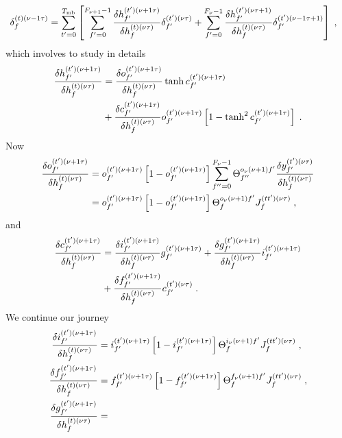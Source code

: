 \begin{subappendices}
\begin{align}
\delta^{(t)(\nu-1\tau)}_f&= \sum_{t'=0}^{T_{{\rm mb}}}\left[\sum_{f'=0}^{F_{\nu+1}-1}
%
\frac{\delta h^{(t')(\nu+1\tau)}_{f'}}{\delta h^{(t)(\nu\tau)}_f }\delta^{(t')(\nu\tau)}_{f'}
%
+\sum_{f'=0}^{F_{\nu}-1}\frac{\delta h^{(t')(\nu\tau+1)}_{f'}}{\delta h^{(t)(\nu\tau)}_f }\delta^{(t')(\nu-1\tau+1)}_{f'}\right]\;,
\end{align}
which involves to study in details
\begin{align}
\frac{\delta h^{(t')(\nu+1\tau)}_{f'}}{\delta h^{(t)(\nu\tau)}_f }&=
%
\frac{\delta o^{(t')(\nu+1\tau)}_{f'}}{\delta h^{(t)(\nu\tau)}_f }\tanh c^{(t')(\nu+1\tau)}_{f'}\notag\\
%
&+\frac{\delta c^{(t')(\nu+1\tau)}_{f'}}{\delta h^{(t)(\nu\tau)}_f } o^{(t')(\nu+1\tau)}_{f'}
%
\left[1-\tanh^2 c^{(t')(\nu+1\tau)}_{f'}\right]\;.
\end{align}
Now
\begin{align}
\frac{\delta o^{(t')(\nu+1\tau)}_{f'}}{\delta h^{(t)(\nu\tau)}_f }&=o^{(t')(\nu+1\tau)}_{f'}
%
\left[1-o^{(t')(\nu+1\tau)}_{f'}\right]\sum_{f''=0}^{F_\nu-1}\Theta^{o_\nu(\nu+1)f'}_{f''}
%
\frac{\delta y^{(t')(\nu\tau)}_{f'}}{\delta h^{(t)(\nu\tau)}_f }\notag\\
%
&=o^{(t')(\nu+1\tau)}_{f'}
%
\left[1-o^{(t')(\nu+1\tau)}_{f'}\right]\Theta^{o_\nu(\nu+1)f'}_{f}
%
J^{(tt')(\nu\tau)}_f\;,
\end{align}
and
\begin{align}
\frac{\delta c^{(t')(\nu+1\tau)}_{f'}}{\delta h^{(t)(\nu\tau)}_f }&=
%
\frac{\delta i^{(t')(\nu+1\tau)}_{f'}}{\delta h^{(t)(\nu\tau)}_f }g^{(t')(\nu+1\tau)}_{f'}
%
+\frac{\delta g^{(t')(\nu+1\tau)}_{f'}}{\delta h^{(t)(\nu\tau)}_f }i^{(t')(\nu+1\tau)}_{f'}\notag\\
%
&+\frac{\delta f^{(t')(\nu+1\tau)}_{f'}}{\delta h^{(t)(\nu\tau)}_f }c^{(t')(\nu\tau)}_{f'}\;.
\end{align}
We continue our journey
\begin{align}
\frac{\delta i^{(t')(\nu+1\tau)}_{f'}}{\delta h^{(t)(\nu\tau)}_f }&=
%
 i^{(t')(\nu+1\tau)}_{f'}\left[1- i^{(t')(\nu+1\tau)}_{f'}\right]\Theta^{i_\nu(\nu+1)f'}_{f}
%
J^{(tt')(\nu\tau)}_f\;,\notag\\
%
\frac{\delta f^{(t')(\nu+1\tau)}_{f'}}{\delta h^{(t)(\nu\tau)}_f }&=
%
 f^{(t')(\nu+1\tau)}_{f'}\left[1- f^{(t')(\nu+1\tau)}_{f'}\right]\Theta^{f_\nu(\nu+1)f'}_{f}
%
J^{(tt')(\nu\tau)}_f\;,\notag\\
%
\frac{\delta g^{(t')(\nu+1\tau)}_{f'}}{\delta h^{(t)(\nu\tau)}_f }&=

\end{align}
\end{subappendices}
